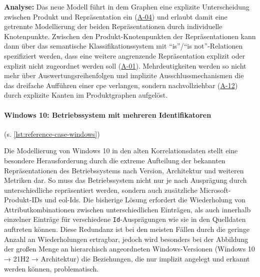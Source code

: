 \textbf{Analyse:}
Das neue Modell führt in dem Graphen eine explizite Unterscheidung zwischen Produkt und Repräsentation ein (\hyperref[subsec:req-product-concept]{A-04}) und erlaubt damit eine getrennte Modellierung der beiden Repräsentationen durch individuelle Knotenpunkte.
Zwischen den Produkt-Knotenpunkten der Repräsentationen kann dann über das semantische Klassifikationssystem mit \enquote{is}/\enquote{is not}-Relationen spezifiziert werden, dass eine weitere angrenzende Repräsentation explizit oder explizit nicht zugeordnet werden soll (\hyperref[subsec:req-format-product-graph]{A-01}).
Mehrdeutigkeiten werden so nicht mehr über Auswertungsreihenfolgen und implizite Ausschlussmechanismen die das dreifache Aufführen einer \acrshort{cpe} verlangen, sondern nachvollziehbar (\hyperref[subsec:req-reason-format]{A-12}) durch explizite Kanten im Produktgraphen aufgelöst.

\paragraph{Windows 10: Betriebssystem mit mehreren Identifikatoren}\label{par:reference-case-windows} (s. \autoref{lst:reference-case-windows})

Die Modellierung von Windows 10 in den alten Korrelationsdaten stellt eine besondere Herausforderung durch die extreme Aufteilung der bekannten Repräsentationen des Betriebssystems nach Version, Architektur und weiteren Metriken dar.
So muss das Betriebssystem nicht nur je nach Ausprägung durch unterschiedliche  repräsentiert werden, sondern auch zusätzliche Microsoft-Produkt-IDs und \acrshort{eol}-Ids.
Die bisherige Lösung erfordert die Wiederholung von Attributkombinationen zwischen unterschiedlichen Einträgen, als auch innerhalb einzelner Einträge für verschiedene \texttt{Id}-Ausprägungen wie sie in den Quelldaten auftreten können.
Diese Redundanz ist bei den meisten Fällen durch die geringe Anzahl an Wiederholungen ertragbar, jedoch wird besonders bei der Abbildung der großen Menge an hierarchisch angeordneten Windows-Versionen (Windows 10 → 21H2 → Architektur) die Beziehungen, die nur implizit angelegt und erkannt werden können, problematisch.

